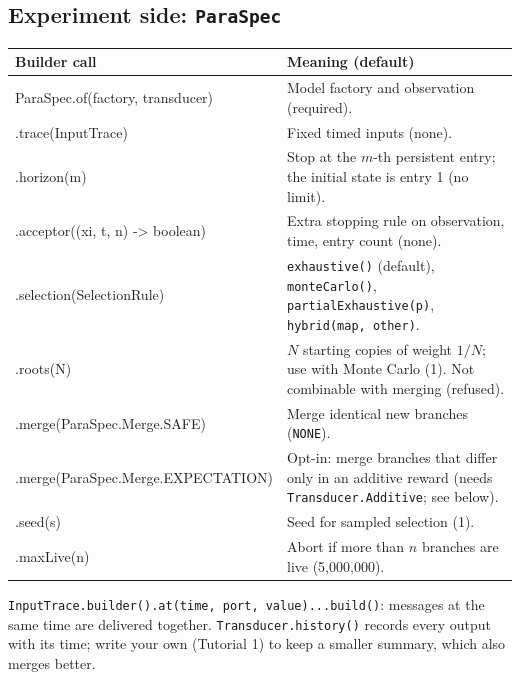 \documentclass[11pt]{article}
\newcommand{\code}[1]{\texttt{#1}}
\begin{document}
\subsection{Experiment side: \code{ParaSpec}}
\begin{center}
\begin{tabularx}{\linewidth}{@{}>{\ttfamily\small}p{6.6cm} Y@{}}
\toprule
\normalfont\textbf{Builder call} & \textbf{Meaning (default)}\\
\midrule
ParaSpec.of(factory, transducer) & Model factory and observation (required).\\
.trace(InputTrace) & Fixed timed inputs (none).\\
.horizon(m) & Stop at the $m$-th persistent entry; the initial state is entry 1 (no limit).\\
.acceptor((xi, t, n) -> boolean) & Extra stopping rule on observation, time, entry count (none).\\
.selection(SelectionRule) & \code{exhaustive()} (default), \code{monteCarlo()}, \code{partialExhaustive(p)}, \code{hybrid(map, other)}.\\
.roots(N) & $N$ starting copies of weight $1/N$; use with Monte Carlo (1). Not combinable with merging (refused).\\
.merge(ParaSpec.Merge.SAFE) & Merge identical new branches (\code{NONE}).\\
.merge(ParaSpec.Merge.EXPECTATION) & Opt-in: merge branches that differ only in an additive reward (needs \code{Transducer.Additive}; see below).\\
.seed(s) & Seed for sampled selection (1).\\
.maxLive(n) & Abort if more than $n$ branches are live (5{,}000{,}000).\\
\bottomrule
\end{tabularx}
\end{center}
\code{InputTrace.builder().at(time, port, value)...build()}: messages at the same time are delivered together.
\code{Transducer.history()} records every output with its time; write your own (Tutorial 1) to keep a smaller summary,
which also merges better.
\end{document}

